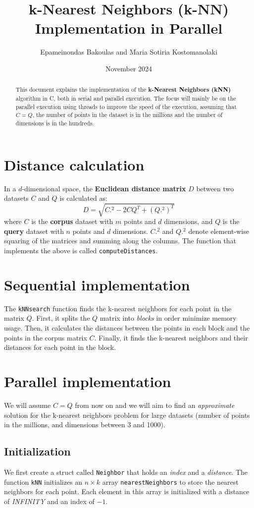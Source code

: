 \documentclass{article}
\title{k-Nearest Neighbors (k-NN) Implementation in Parallel}
\author{Epameinondas Bakoulas and Maria Sotiria Kostomanolaki}
\date{November 2024}
\begin{document}
\maketitle

\begin{abstract}
    This document explains the implementation of the \textbf{k-Nearest Neighbors (kNN)} algorithm in C, both in serial and parallel execution.
    The focus will mainly be on the parallel execution using threads to improve the speed of the execution, assuming that $C=Q$, the
    number of points in the dataset is in the millions and the number of dimensions is in the hundreds.
\end{abstract}

\section{Distance calculation}
In a $d$-dimensional space, the \textbf{Euclidean distance matrix} $D$ between two datasets 
$C$ and $Q$ is calculated as: 
\[
D = \sqrt{C.^2 - 2 C Q^T + (Q.^2)^T}
\]
where $C$ is the \textbf{corpus} dataset with $m$ points and $d$ dimensions, and $Q$ is the \textbf{query} dataset with $n$ points and $d$ dimensions.
$C.^2$ and $Q.^2$ denote element-wise squaring of the matrices and summing along the columns.
The function that implements the above is called \texttt{computeDistances}.

\section{Sequential implementation}
The \texttt{kNNsearch} function finds the k-nearest neighbors for each point in the matrix $Q$.
First, it splits the $Q$ matrix into \emph{blocks} in order minimize memory usage.
Then, it calculates the distances between the points in each block and the points in the corpus matrix $C$.
Finally, it finds the k-nearest neighbors and their distances for each point in the block.

\section{Parallel implementation}
We will assume $C=Q$ from now on and we will aim to find an \emph{approximate} solution for the k-nearest neighbors problem
for large datasets (number of points in the millions, and dimensions between 3 and 1000).


\subsection{Initialization}
We first create a struct called \texttt{Neighbor} that holds an \emph{index} and a \emph{distance}.
The function \texttt{kNN} initializes an $n \times k$ array \texttt{nearestNeighbors} to store the nearest neighbors for each point.
Each element in this array is initialized with a distance of \emph{INFINITY} and an index of $-1$.
\end{document}
